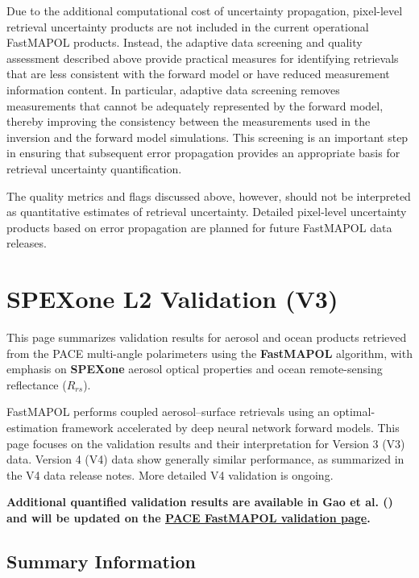 \documentclass[
  11pt,
  letterpaper,
]{scrreprt}
\begin{document}
Due to the additional computational cost of uncertainty propagation,
pixel-level retrieval uncertainty products are not included in the
current operational FastMAPOL products. Instead, the adaptive data
screening and quality assessment described above provide practical
measures for identifying retrievals that are less consistent with the
forward model or have reduced measurement information content. In
particular, adaptive data screening removes measurements that cannot be
adequately represented by the forward model, thereby improving the
consistency between the measurements used in the inversion and the
forward model simulations. This screening is an important step in
ensuring that subsequent error propagation provides an appropriate basis
for retrieval uncertainty quantification.

The quality metrics and flags discussed above, however, should not be
interpreted as quantitative estimates of retrieval uncertainty. Detailed
pixel-level uncertainty products based on error propagation are planned
for future FastMAPOL data releases.


\chapter{SPEXone L2 Validation (V3)}\label{spexone-l2-validation-v3}

This page summarizes validation results for aerosol and ocean products
retrieved from the PACE multi-angle polarimeters using the
\textbf{FastMAPOL} algorithm, with emphasis on \textbf{SPEXone} aerosol
optical properties and ocean remote-sensing reflectance (\(R_{rs}\)).

FastMAPOL performs coupled aerosol--surface retrievals using an
optimal-estimation framework accelerated by deep neural network forward
models. This page focuses on the validation results and their
interpretation for Version 3 (V3) data. Version 4 (V4) data show
generally similar performance, as summarized in the V4 data release
notes. More detailed V4 validation is ongoing.

\textbf{Additional quantified validation results are available in Gao et
al. () and will be updated on the
\href{https://pace.oceansciences.org/pace_fastmapol.htm}{PACE FastMAPOL
validation page}.}

\section{Summary Information}\label{summary-information}
\end{document}
